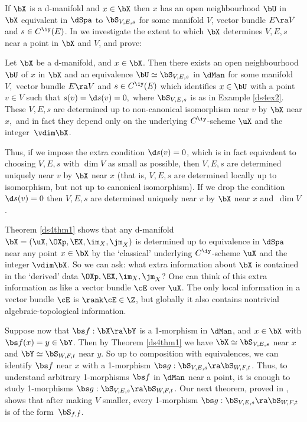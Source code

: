 \documentclass{article}
\begin{document}
If $\bX$ is a d-manifold and $x\in\bX$ then $x$ has an open
neighbourhood $\bU$ in $\bX$ equivalent in $\dSpa$ to $\bS_{V,E,s}$
for some manifold $V$, vector bundle $E\ra V$ and $s\in C^\iy(E)$.
In \cite[\S 3.3]{Joyc6} we investigate the extent to which $\bX$
determines $V,E,s$ near a point in $\bX$ and $V$, and prove:

\begin{thm} Let\/ $\bX$ be a d-manifold, and\/ $x\in\bX$. Then
there exists an open neighbourhood\/ $\bU$ of\/ $x$ in $\bX$ and an
equivalence $\bU\simeq\bS_{V,E,s}$ in $\dMan$ for some manifold\/
$V,$ vector bundle $E\ra V$ and\/ $s\in C^\iy(E)$ which identifies
$x\in\bU$ with a point\/ $v\in V$ such that\/ $s(v)=\d s(v)=0,$
where $\bS_{V,E,s}$ is as in Example\/ {\rm\ref{ds4ex2}}. These
$V,E,s$ are determined up to non-canonical isomorphism near $v$ by
$\bX$ near $x,$ and in fact they depend only on the underlying\/
$C^\iy$-scheme $\uX$ and the integer\/~$\vdim\bX$.
\label{ds4thm1}
\end{thm}

Thus, if we impose the extra condition $\d s(v)=0$, which is in fact
equivalent to choosing $V,E,s$ with $\dim V$ as small as possible,
then $V,E,s$ are determined uniquely near $v$ by $\bX$ near $x$
(that is, $V,E,s$ are determined locally up to isomorphism, but not
up to canonical isomorphism). If we drop the condition $\d s(v)=0$
then $V,E,s$ are determined uniquely near $v$ by $\bX$ near $x$
and~$\dim V$.

Theorem \ref{ds4thm1} shows that any d-manifold
$\bX=(\uX,\OXp,\EX,\im_X,\jm_X)$ is determined up to equivalence in
$\dSpa$ near any point $x\in\bX$ by the `classical' underlying
$C^\iy$-scheme $\uX$ and the integer $\vdim\bX$. So we can ask: what
extra information about $\bX$ is contained in the `derived' data
$\OXp,\EX,\im_X,\jm_X$? One can think of this extra information as
like a vector bundle $\cE$ over $\uX$. The only local information in
a vector bundle $\cE$ is $\rank\cE\in\Z$, but globally it also
contains nontrivial algebraic-topological information.

Suppose now that $\bs f:\bX\ra\bY$ is a 1-morphism in $\dMan$, and
$x\in\bX$ with $\bs f(x)=y\in\bY$. Then by Theorem \ref{ds4thm1} we
have $\bX\simeq\bS_{V,E,s}$ near $x$ and $\bY\simeq\bS_{W,F,t}$ near
$y$. So up to composition with equivalences, we can identify $\bs f$
near $x$ with a 1-morphism $\bs g:\bS_{V,E,s}\ra\bS_{W,F,t}$. Thus,
to understand arbitrary 1-morphisms $\bs f$ in $\dMan$ near a point,
it is enough to study 1-morphisms $\bs g:\bS_{V,E,s}\ra\bS_{W,F,t}$.
Our next theorem, proved in \cite[\S 3.4]{Joyc6}, shows that after
making $V$ smaller, every 1-morphism $\bs g:\bS_{V,E,s}
\ra\bS_{W,F,t}$ is of the form~$\bS_{\smash{f,\hat f}}$.
\end{document}
